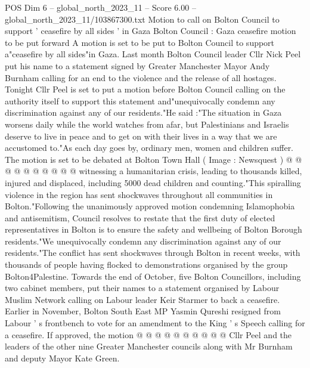 \begin{textsample}{POS Dim 6 – global\_north\_2023\_11 – Score 6.00 – global\_north\_2023\_11/103867300.txt}  \label{ex:f6_pos_213}
Motion to call on Bolton Council to support ' ceasefire by all sides ' in Gaza Bolton Council : Gaza ceasefire motion to be put forward A motion is set to be put to Bolton Council to support a"ceasefire by all sides"in Gaza.
Last month Bolton Council leader Cllr Nick Peel put his name to a statement signed by Greater Manchester Mayor Andy Burnham calling for an end to the violence and the release of all hostages.
Tonight Cllr Peel is set to put a motion before Bolton Council calling on the authority itself to support this statement and"unequivocally condemn any discrimination against any of our residents."He said :"The situation in Gaza worsens daily while the world watches from afar, but Palestinians and Israelis deserve to live in peace and to get on with their lives in a way that we are accustomed to."As each day goes by, ordinary men, women and children suffer.
The motion is set to be debated at Bolton Town Hall ( Image : Newsquest ) @ @ @ @ @ @ @ @ @ @ witnessing a humanitarian crisis, leading to thousands killed, injured and displaced, including 5000 dead children and counting."This spiralling violence in the region has sent shockwaves throughout all communities in Bolton."Following the unanimously approved motion condemning Islamophobia and antisemitism, Council resolves to restate that the first duty of elected representatives in Bolton is to ensure the safety and wellbeing of Bolton Borough residents."We unequivocally condemn any discrimination against any of our residents."The conflict has sent shockwaves through Bolton in recent weeks, with thousands of people having flocked to demonstrations organised by the group Bolton4Palestine.
Towards the end of October, five Bolton Councillors, including two cabinet members, put their names to a statement organised by Labour Muslim Network calling on Labour leader Keir Starmer to back a ceasefire.
Earlier in November, Bolton South East MP Yasmin Qureshi resigned from Labour ' s frontbench to vote for an amendment to the King ' s Speech calling for a ceasefire.
If approved, the motion @ @ @ @ @ @ @ @ @ @ Cllr Peel and the leaders of the other nine Greater Manchester councils along with Mr Burnham and deputy Mayor Kate Green.

\end{textsample}
